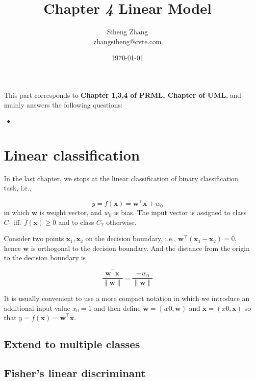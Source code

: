 \documentclass{article}
\author{Siheng Zhang\\zhangsiheng@cvte.com}
\title{Chapter \textbf{\textit{4}} Linear Model}
\date{\today}
\begin{document}
\maketitle  

This part corresponds to \textbf{Chapter 1,3,4 of PRML, Chapter of UML}, and mainly answers the following questions:

\begin{itemize}
\item 
\end{itemize}

\tableofcontents
\newpage

\section{Linear classification}

	In the last chapter, we stops at the linear classification of binary classification task, i.e.,
	
	\begin{equation}
	y=f(\mathbf{x})=\mathbf{w}^\top \mathbf{x} + w_0
	\end{equation}
in which $\mathbf{w}$ is weight vector, and $w_0$ is bias. The input vector is assigned to class $C_1$ iff. $f(\mathbf{x})\geq 0$ and to class $C_2$ otherwise.

	Consider two points $\mathbf{x}_1,\mathbf{x}_2$ on the decision boundary, i.e., $\mathbf{w}^\top (\mathbf{x}_1 - \mathbf{x}_2) = 0$, hence $\mathbf{w}$ is orthogonal to the decision boundary. And the distance from the origin to the decision boundary is
	
	\begin{equation}
	\frac{\mathbf{w}^\top \mathbf{x}}{\|\mathbf{w}\|} = \frac{-w_0}{\|\mathbf{w}\|}
	\end{equation}
	
	It is usually convenient to use a more compact notation in which we introduce an additional input value $x_0 = 1$ and then define $\tilde{\mathbf{w}} = (w0, \mathbf{w})$ and $\tilde{\mathbf{x}} = (x0, \mathbf{x})$ so that $y=f(\mathbf{x}) = \tilde{\mathbf{w}}^\top \tilde{\mathbf{x}}$.
	
	\subsection{Extend to multiple classes}
	
	\subsection{Fisher's linear discriminant}
\end{document}
